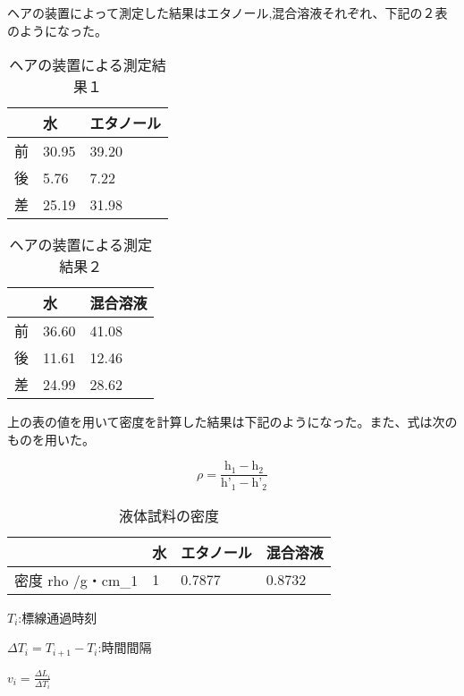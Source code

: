 \documentclass{jsarticle}
\begin{document}
ヘアの装置によって測定した結果はエタノール,混合溶液それぞれ、下記の２表のようになった。

\begin{table}[H]
\centering
\caption{ヘアの装置による測定結果１}
\label{my-label}
\begin{tabular}{|l|l|l|}
\hline
  & 水     & エタノール \\ \hline
前 & 30.95 & 39.20 \\ \hline
後 & 5.76  & 7.22  \\ \hline
差 & 25.19 & 31.98 \\ \hline
\end{tabular}
\end{table}

\begin{table}[H]
\centering
\caption{ヘアの装置による測定結果２}
\label{my-label}
\begin{tabular}{|l|l|l|}
\hline
  & 水     & 混合溶液  \\ \hline
前 & 36.60 & 41.08 \\ \hline
後 & 11.61 & 12.46 \\ \hline
差 & 24.99 & 28.62 \\ \hline
\end{tabular}
\end{table}

上の表の値を用いて密度を計算した結果は下記のようになった。また、式は次のものを用いた。

\begin{equation}
    \rho = \frac{\textrm{h}_1 - \textrm{h}_2}{\textrm{h'}_1 - \textrm{h'}_2}
\end{equation}

\begin{table}[H]
\centering
\caption{液体試料の密度}
\label{my-label}
\begin{tabular}{|l|l|l|l|}
\hline
                & 水 & エタノール  & 混合溶液   \\ \hline
密度 rho /g・cm\_1 & 1 & 0.7877 & 0.8732 \\ \hline
\end{tabular}
\end{table}

\begin{center}
\par $T_i$:標線通過時刻
\par $\Delta T_i = T_{i+1} - T_i$:時間間隔
\par $v_i = \frac{\Delta L_i}{\Delta T_i}$
\end{center}
\end{document}
